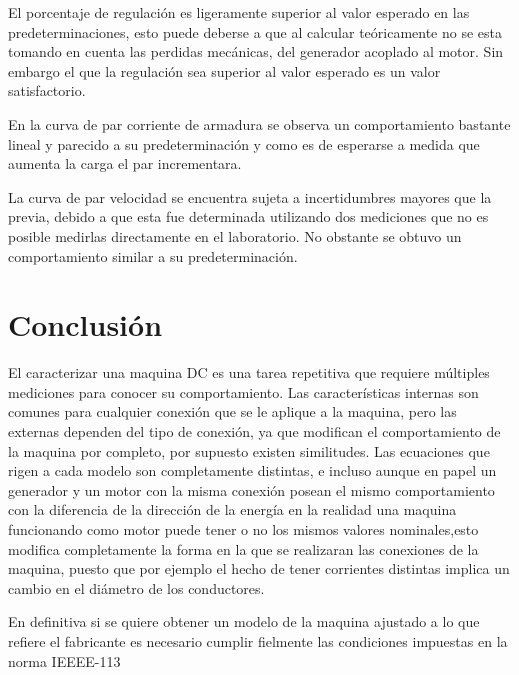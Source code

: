 \documentclass[11pt,letterpaper]{article}     %
\begin{document}
El porcentaje de regulación es ligeramente superior al valor esperado en las predeterminaciones, esto puede deberse a que al calcular teóricamente no se esta tomando en cuenta las perdidas mecánicas, del generador acoplado al motor. Sin embargo el que la regulación sea superior al valor esperado es un valor satisfactorio.

En la curva de par corriente de armadura se observa un comportamiento bastante lineal y parecido a su predeterminación y como es de esperarse a medida que aumenta la carga el par incrementara.

La curva de par velocidad se encuentra sujeta a incertidumbres mayores que la previa, debido a que esta fue determinada utilizando dos mediciones que no es posible medirlas directamente en el laboratorio. No obstante se obtuvo un comportamiento similar a su predeterminación. 
\newpage
  \section{Conclusión}
  El caracterizar una maquina DC es una tarea repetitiva que requiere múltiples mediciones para conocer su comportamiento. Las características internas son comunes para cualquier conexión que se le aplique a la maquina, pero las externas dependen del tipo de conexión, ya que modifican el comportamiento de la maquina por completo, por supuesto existen similitudes. Las ecuaciones que rigen a cada modelo son completamente distintas, e incluso aunque en papel un generador y un motor con la misma conexión posean el mismo comportamiento con la diferencia de la dirección de la energía en la realidad una maquina funcionando como motor puede tener o no los mismos valores nominales,esto modifica completamente la forma en la que se realizaran las conexiones de la maquina, puesto que por ejemplo el hecho de tener corrientes distintas implica un cambio en el diámetro de los conductores.
  
  En definitiva si se quiere obtener un modelo de la maquina ajustado a lo que refiere el fabricante es necesario cumplir fielmente las condiciones impuestas en la norma IEEEE-113 
\newpage
\end{document}
